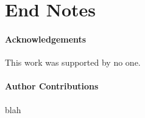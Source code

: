 
\section*{End Notes}

\paragraph{Acknowledgements} This work was supported by no one.

\paragraph{Author Contributions} blah

